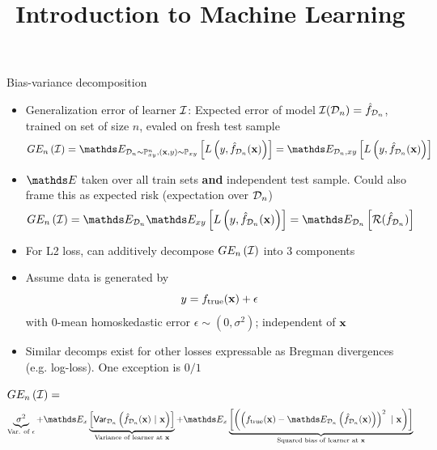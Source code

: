 \documentclass[11pt,compress,t,notes=noshow, xcolor=table]{beamer}
\title{Introduction to Machine Learning}
\begin{document}
    

\begin{vbframe} {Bias-variance decomposition}

\begin{itemize} 
\item Generalization error of learner  $\mathcal{I}$: 
Expected error of model $\mathcal{I}(\mathcal{D}_n) = \hat{f}_{\mathcal{D}_n}$, trained on set of size $n$, evaled on fresh test sample
$$
GE_n\left(\ind\right) = \E_{\D_n \sim \Pxy^n, (\xv, y) \sim \Pxy}\left[ L\left(y, \fh_{\D_n}(\xv)\right) \right] = \E_{\D_n, xy}\left[L\left(y, \fh_{\D_n}(\xv)\right) \right]  
$$

\item $\E$ taken over all train sets \textbf{and} independent test sample. Could also frame this as expected risk (expectation over $\mathcal{D}_n$)
$$GE_n\left(\ind\right) = \E_{\D_n}\E_{xy}\left[ L\left(y, \fh_{\D_n}(\xv)\right)\right] =  \E_{\D_n}\left[\risk(\fh_{\D_n})\right]$$

\item For L2 loss, can additively decompose  $GE_n\left(\mathcal{I}\right)$ into 3 components

\item Assume data is generated by 
$$
y = f_{\text{true}}(\mathbf{x}) + \epsilon
$$
with 0-mean homoskedastic error $\epsilon \sim (0, \sigma^2)$; independent of $\mathbf{x}$

\item Similar decomps exist for other losses expressable as Bregman divergences (e.g. log-loss). One exception is $0/1$ 

\end{itemize} 

\framebreak 


$GE_n\left(\mathcal{I}\right) =$  
$$
 \underbrace{\sigma^2}_{\text{Var. of $\epsilon$}} + \E_{x}\underbrace{\left[\var_{\D_n}\left(\fh_{\D_n}(\xv) ~|~\xv\right)\right]}_{\text{Variance of learner at } \xv} + \E_{x}\underbrace{\left[\left(\left(\ftrue(\xv)-\E_{\D_n}\left(\fh_{\D_n}(\xv)\right)\right)^2~|~\xv\right)\right]}_{\text{Squared bias of learner at } \xv}  
$$


\end{vbframe}
\end{document}
